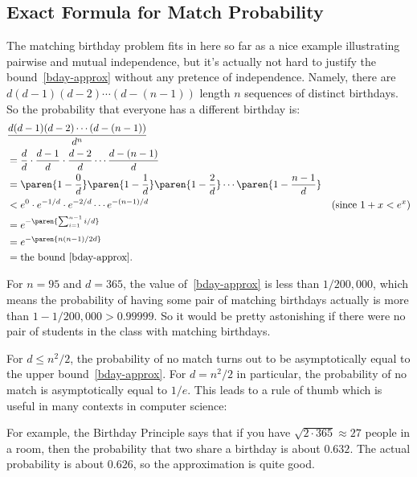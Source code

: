 \subsection{Exact Formula for Match Probability}
The matching birthday problem fits in here so far as a nice example
illustrating pairwise and mutual independence, but it's actually not
hard to justify the bound~\eqref{bday-approx} without any pretence of
independence.  Namely, there are $d (d - 1) (d - 2) \cdots (d - (n -
1))$ length $n$ sequences of distinct birthdays.  So the probability
that everyone has a different birthday is:
\begin{align*}
\lefteqn{\frac{d (d - 1) (d - 2) \cdots (d - (n - 1))}{d^n}}\\
   & = \frac{d}{d} \cdot \frac{d-1}{d} \cdot \frac{d-2}{d} \cdots \frac{d - (n - 1)}{d}\\
   & = \paren{1 - \frac{0}{d}}
             \paren{1 - \frac{1}{d}}
             \paren{1 - \frac{2}{d}}
             \cdots
             \paren{1 - \frac{n - 1}{d}}\\
   & < e^0 \cdot e^{-1/d} \cdot e^{-2/d} \cdots e^{-(n-1)/d} 
             & \text{(since $1+x < e^x$)} \\
   & = e^{-\paren{\sum_{i=1}^{n-1} i/d}}\\
   & = e^{-\paren{n(n-1)/2d}}\\
   & = \text{the bound~\eqref{bday-approx}}.
\end{align*}

For $n=95$ and $d = 365$, the value of~\eqref{bday-approx} is less
than $1/200,000$, which means the probability of having some pair of
matching birthdays actually is more than $1 - 1/200,000 > 0.99999$.  So
it would be pretty astonishing if there were no pair of students in
the class with matching birthdays.

For $d \leq n^2/2$, the probability of no match turns out to be
asymptotically equal to the upper bound~\eqref{bday-approx}.  For $d =
n^2/2$ in particular, the probability of no match is asymptotically
equal to $1/e$.  This leads to a rule of thumb which is useful in many
contexts in computer science:


For example, the Birthday Principle says that if you have $\sqrt{2
  \cdot 365} \approx 27$ people in a room, then the probability that
two share a birthday is about $0.632$.  The actual probability is
about $0.626$, so the approximation is quite good.

